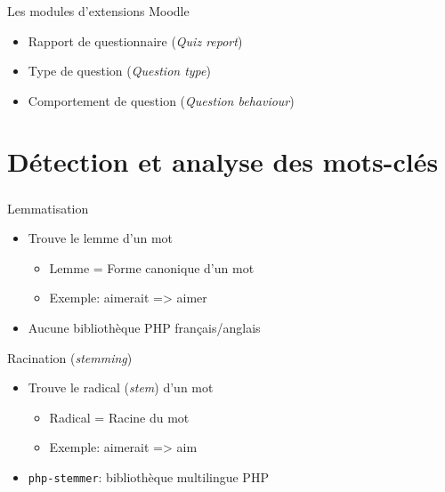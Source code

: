 \documentclass{beamer}
\begin{document}
  \begin{frame}
    \frametitle{\insertsection}
    \begin{block}{Les modules d'extensions Moodle}
      \begin{itemize}
        \item Rapport de questionnaire (\textit{Quiz report})
        \item Type de question (\textit{Question type})
        \item Comportement de question (\textit{Question behaviour})
      \end{itemize}
    \end{block}
  \end{frame}
  
  \section[Mots-cl\'es]{D\'etection et analyse des mots-cl\'es}
  \begin{frame}
    \frametitle{\insertsection}
    \begin{block}{Lemmatisation}
      \begin{itemize}
        \item Trouve le lemme d'un mot
              \begin{itemize}
                      \item Lemme = Forme \alert{canonique} d'un mot
                      \item Exemple: aimerait => aimer
                      \end{itemize}

       \medskip
       \item Aucune biblioth\`eque PHP fran\c{c}ais/anglais
      \end{itemize}
    \end{block}
  
    \vfill
    \pause
  
    \begin{block}{Racination (\textit{stemming})}
      \begin{itemize}
        \item Trouve le radical (\textit{stem}) d'un mot
        \begin{itemize}
        \item Radical = Racine du mot
        \item Exemple: aimerait => aim
        \end{itemize}

       \medskip
        \item \texttt{php-stemmer}: biblioth\`eque multilingue PHP
      \end{itemize}
    \end{block}
    \vfill
  \end{frame}
  
\end{document}
